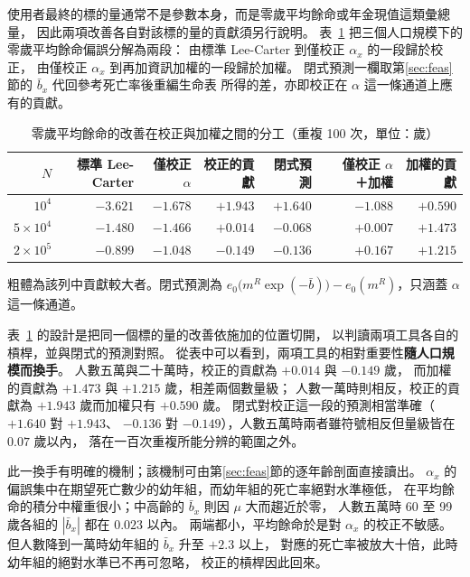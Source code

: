 \documentclass[UTF8, fontset=macnew, a4paper, 12pt]{ctexart}
\begin{document}
使用者最終的標的量通常不是參數本身，而是零歲平均餘命或年金現值這類彙總量，
因此兩項改善各自對該標的量的貢獻須另行說明。
表~\ref{tab:split} 把三個人口規模下的零歲平均餘命偏誤分解為兩段：
由標準 Lee-Carter 到僅校正 $\alpha_x$ 的一段歸於校正，
由僅校正 $\alpha_x$ 到再加資訊加權的一段歸於加權。
閉式預測一欄取第\ref{sec:feas}節的 $\bar b_x$ 代回參考死亡率後重編生命表
所得的差，亦即校正在 $\alpha$ 這一條通道上應有的貢獻。

\begin{table}[H]
\centering
\caption{零歲平均餘命的改善在校正與加權之間的分工（重複 100 次，單位：歲）}
\small
\begin{tabular}{rrrrrrr}
\toprule
$N$ & 標準 Lee-Carter & 僅校正 $\alpha$ & 校正的貢獻 & 閉式預測
 & \ 僅校正 $\alpha$ ＋加權 & 加權的貢獻\\
\midrule
$10^{4}$          & $-3.621$ & $-1.678$ & $\mathbf{+1.943}$ & $+1.640$ & $-1.088$ & $+0.590$\\
$5\times10^{4}$   & $-1.480$ & $-1.466$ & $+0.014$ & $-0.068$ & $+0.007$ & $\mathbf{+1.473}$\\
$2\times10^{5}$   & $-0.899$ & $-1.048$ & $-0.149$ & $-0.136$ & $+0.167$ & $\mathbf{+1.215}$\\
\bottomrule
\end{tabular}

\vspace{3pt}
{\footnotesize 粗體為該列中貢獻較大者。閉式預測為
$e_0\bigl(m^{R}\exp(-\bar b)\bigr)-e_0(m^{R})$，只涵蓋 $\alpha$ 這一條通道。}
\label{tab:split}
\end{table}

表~\ref{tab:split} 的設計是把同一個標的量的改善依施加的位置切開，
以判讀兩項工具各自的槓桿，並與閉式的預測對照。
從表中可以看到，兩項工具的相對重要性\textbf{隨人口規模而換手}。
人數五萬與二十萬時，校正的貢獻為 $+0.014$ 與 $-0.149$ 歲，
而加權的貢獻為 $+1.473$ 與 $+1.215$ 歲，相差兩個數量級；
人數一萬時則相反，校正的貢獻為 $+1.943$ 歲而加權只有 $+0.590$ 歲。
閉式對校正這一段的預測相當準確（$+1.640$ 對 $+1.943$、
$-0.136$ 對 $-0.149$），人數五萬時兩者雖符號相反但量級皆在 $0.07$ 歲以內，
落在一百次重複所能分辨的範圍之外。

此一換手有明確的機制；該機制可由第\ref{sec:feas}節的逐年齡剖面直接讀出。
$\alpha_x$ 的偏誤集中在期望死亡數少的幼年組，而幼年組的死亡率絕對水準極低，
在平均餘命的積分中權重很小；中高齡的 $\bar b_x$ 則因 $\mu$ 大而趨近於零，
人數五萬時 60 至 99 歲各組的 $|\bar b_x|$ 都在 $0.023$ 以內。
兩端都小，平均餘命於是對 $\alpha_x$ 的校正不敏感。
但人數降到一萬時幼年組的 $\bar b_x$ 升至 $+2.3$ 以上，
對應的死亡率被放大十倍，此時幼年組的絕對水準已不再可忽略，
校正的槓桿因此回來。
\end{document}
